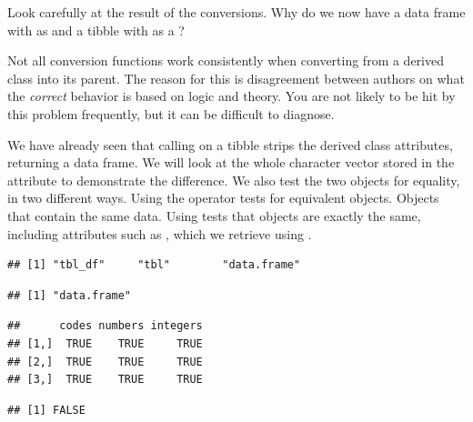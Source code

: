 \documentclass[krantz2]{krantz}\usepackage{knitr}
\begin{document}
\begin{playground}
Look carefully at the result of the conversions. Why do we now have a data frame with  as  and a tibble with  as a ?
\end{playground}

\begin{explainbox}
Not all conversion functions work consistently when converting from a derived class into its parent. The reason for this is disagreement between authors on what the \emph{correct} behavior is based on logic and theory. You are not likely to be hit by this problem frequently, but it can be difficult to diagnose.

We have already seen that calling  on a tibble strips the derived class attributes, returning a data frame. We will look at the whole character vector stored in the  attribute to demonstrate the difference. We also test the two objects for equality, in two different ways. Using the operator \code{==} tests for equivalent objects. Objects that contain the same data. Using  tests that objects are exactly the same, including attributes such as , which we retrieve using .

\begin{knitrout}\footnotesize
{}\color{fgcolor}\begin{kframe}
\begin{alltt}
\end{alltt}
\begin{verbatim}
## [1] "tbl_df"     "tbl"        "data.frame"
\end{verbatim}
\begin{alltt}
\end{alltt}
\begin{verbatim}
## [1] "data.frame"
\end{verbatim}
\begin{alltt}
 \hlopt{==} 
\end{alltt}
\begin{verbatim}
##      codes numbers integers
## [1,]  TRUE    TRUE     TRUE
## [2,]  TRUE    TRUE     TRUE
## [3,]  TRUE    TRUE     TRUE
\end{verbatim}
\begin{alltt}
\end{alltt}
\begin{verbatim}
## [1] FALSE
\end{verbatim}
\end{kframe}
\end{knitrout}


\end{explainbox}
\end{document}
